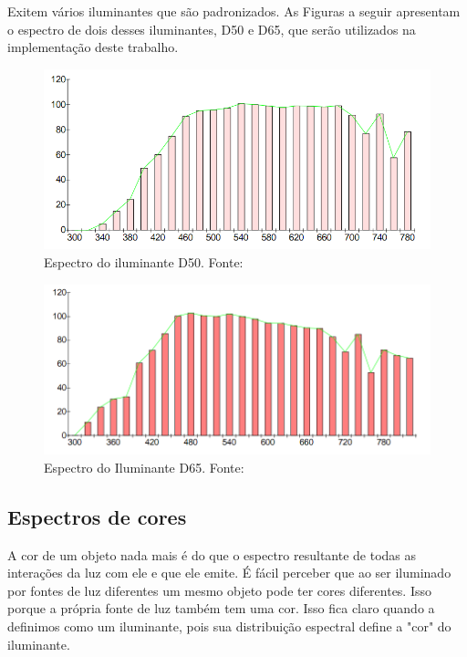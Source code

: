 \par
Exitem vários iluminantes que são padronizados. As Figuras a seguir apresentam
o espectro de dois desses iluminantes, D50 e D65, que serão utilizados na
implementação deste trabalho.

\begin{figure}[!htb]
     \centering
     \includegraphics[scale=0.6]{img/illuminant_d50.png}
     \caption{Espectro do iluminante D50. Fonte:
}
     \label{fig:illuminant_d50}
\end{figure}

\begin{figure}[!htb]
     \centering
     \includegraphics[scale=0.6]{img/illuminant_d65.png}
     \caption{Espectro do Iluminante D65. Fonte:
}
     \label{fig:illuminant_d65}
\end{figure}

\subsection{Espectros de cores}
\par
A cor de um objeto nada mais é do que o espectro resultante de todas as
interações da luz com ele e que ele emite. É fácil perceber que ao ser iluminado
por fontes de luz diferentes um mesmo objeto pode ter cores diferentes. Isso
porque a própria fonte de luz também tem uma cor. Isso fica claro quando a
definimos como um iluminante, pois sua distribuição espectral define a "cor" do
iluminante.

